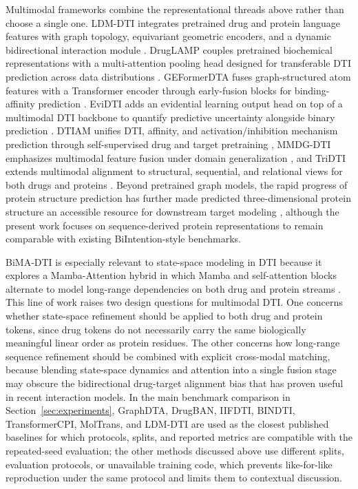 Multimodal frameworks combine the representational threads above rather than choose a single one. LDM-DTI
integrates pretrained drug and protein language features with graph topology, equivariant geometric encoders,
and a dynamic bidirectional interaction module \citep{ji2026ldmdti}. DrugLAMP couples pretrained
biochemical representations with a multi-attention pooling head designed for transferable DTI prediction
across data distributions \citep{luo2024druglamp}. GEFormerDTA fuses graph-structured atom features with a
Transformer encoder through early-fusion blocks for binding-affinity prediction \citep{liu2024geformerdta}.
EviDTI adds an evidential learning output head on top of a multimodal DTI backbone to quantify predictive
uncertainty alongside binary prediction \citep{zhao2025evidti}. DTIAM unifies DTI, affinity, and
activation/inhibition mechanism prediction through self-supervised drug and target pretraining
\citep{lu2025dtiam}, MMDG-DTI emphasizes multimodal feature fusion under domain generalization
\citep{hua2025mmdgdti}, and TriDTI extends multimodal alignment to structural, sequential, and relational
views for both drugs and proteins \citep{yun2026tridti}. Beyond pretrained graph models, the rapid progress
of protein structure prediction has further made predicted three-dimensional protein structure an accessible
resource for downstream target modeling \citep{jumper2021alphafold}, although the present work focuses on
sequence-derived protein representations to remain comparable with existing BiIntention-style benchmarks.

BiMA-DTI is especially relevant to state-space modeling in DTI because it explores a Mamba-Attention hybrid
in which Mamba and self-attention blocks alternate to model long-range dependencies on both drug and protein
streams \citep{shui2025bimadti}. This line of work raises two design questions for multimodal DTI. One
concerns whether state-space refinement should be applied to both drug and protein tokens, since drug tokens
do not necessarily carry the same biologically meaningful linear order as protein residues. The other
concerns how long-range sequence refinement should be combined with explicit cross-modal matching, because
blending state-space dynamics and attention into a single fusion stage may obscure the bidirectional
drug-target alignment bias that has proven useful in recent interaction models. In the main benchmark
comparison in Section~\ref{sec:experiments}, GraphDTA, DrugBAN, IIFDTI, BINDTI, TransformerCPI, MolTrans,
and LDM-DTI are used as the closest published baselines for which protocols, splits, and reported metrics
are compatible with the repeated-seed evaluation; the other methods discussed above use different splits,
evaluation protocols, or unavailable training code, which prevents like-for-like reproduction under the same
protocol and limits them to contextual discussion.
